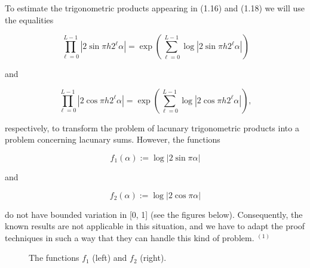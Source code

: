 \documentclass[10pt]{article}
\newcommand{\1}{\mathbf{1}}
\begin{document}
To estimate the trigonometric products appearing in (1.16) and (1.18) we will use the equalities


\begin{equation*}
\prod_{\ell=0}^{L-1}\left|2 \sin \pi h 2^{\ell} \alpha\right|=\exp \left(\sum_{\ell=0}^{L-1} \log \left|2 \sin \pi h 2^{\ell} \alpha\right|\right) \tag{2.2}
\end{equation*}


and


\begin{equation*}
\prod_{\ell=0}^{L-1}\left|2 \cos \pi h 2^{\ell} \alpha\right|=\exp \left(\sum_{\ell=0}^{L-1} \log \left|2 \cos \pi h 2^{\ell} \alpha\right|\right), \tag{2.3}
\end{equation*}


respectively, to transform the problem of lacunary trigonometric products into a problem concerning lacunary sums. However, the functions


\begin{equation*}
f_{1}(\alpha):=\log |2 \sin \pi \alpha| \tag{2.4}
\end{equation*}


and


\begin{equation*}
f_{2}(\alpha):=\log |2 \cos \pi \alpha| \tag{2.5}
\end{equation*}


do not have bounded variation in [0, 1] (see the figures below). Consequently, the known results are not applicable in this situation, and we have to adapt the proof techniques in such a way that they can handle this kind of problem. ${ }^{(1)}$

\begin{figure}[htbp]
\centering
{}
\caption{The functions $f_1$ (left) and $f_2$ (right).}
\label{fig:f1-f2}
\end{figure}
\end{document}
